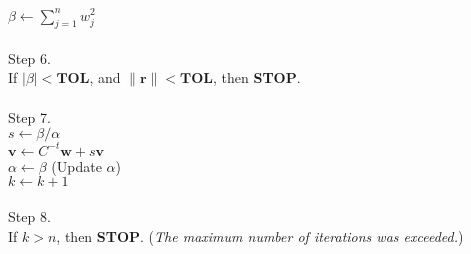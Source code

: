 \documentclass[12pt, a4paper]{article}
\begin{document}
$\beta \gets \sum_{j=1}^{n}w_j^2$ \\
\\
Step 6. 
\\
If $|\beta| < \mathbf{TOL}$, and $\|\mathbf{r}\| < \mathbf{TOL} $, then \textbf{STOP}.
\\
\\
Step 7.
\\
$s \gets \beta/\alpha$ \\
$\mathbf{v} \gets C^{-t}\mathbf{w} + s\mathbf{v}$ \\
$\alpha \gets \beta$ (Update $\alpha$) \\
$k \gets k + 1$\\
\\
Step 8.
\\
If $k > n$, then \textbf{STOP}. (\textit{The maximum number of iterations was exceeded.})
\\
\end{document}
